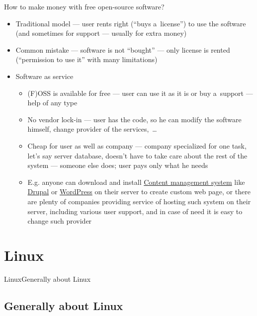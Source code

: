 \documentclass[compress, xelatex, 11pt, xcolor=svgnames, aspectratio=169,
	hyperref={
		bookmarks=true,
		unicode=true,
		colorlinks=true,
		pdftitle={Linux, command line and MetaCentrum},
		plainpages=false,
		pdfauthor={Vojtech Zeisek},
		pdfsubject={Course about use of Linux command line, writing shell scripts and using MetaCentrum of CESNET},
		pdfcreator={XeLaTeX},
		pdfkeywords={Linux, GNU, BASH, shell, command line, MetaCentrum},
		linkcolor=DarkRed, %
		anchorcolor=DarkBlue, %
		citecolor=Indigo, %
		filecolor=NavyBlue, %
		menucolor=DarkMagenta, %
		urlcolor=DarkBlue, %
		},
	url={hyphens, lowtilde} %
	]{beamer}
\begin{document}
\begin{frame}{How to make money with free open-source software?}
	\begin{itemize}
		\item Traditional model --- user rents right (\enquote{buys a~license}) to use the software (and sometimes for support --- usually for extra money)
		\item Common mistake --- software is not \enquote{bought} --- only license is rented (\enquote{permission to use it} with many limitations)
		\item Software as service
		\begin{itemize}
			\item (F)OSS is available for free --- user can use it as it is or buy a~support --- help of any type
			\item No vendor lock-in --- user has the code, so he can modify the software himself, change provider of the services,~\ldots
			\item Cheap for user as well as company --- company specialized for one task, let's say server database, doesn't have to take care about the rest of the system --- someone else does; user pays only what he needs
			\item E.g. anyone can download and install \href{https://en.wikipedia.org/wiki/Content_management_system}{Content management system} like \href{https://www.drupal.org/}{Drupal} or \href{https://wordpress.org/}{WordPress} on their server to create custom web page, or there are plenty of companies providing service of hosting such system on their server, including various user support, and in case of need it is easy to change such provider
		\end{itemize}
	\end{itemize}
\end{frame}

\section{Linux}

\begin{frame}{Linux}{Generally about Linux}
	\tableofcontents[currentsection, sectionstyle=show/hide, hideothersubsections]
\end{frame}

\subsection{Generally about Linux}
\end{document}
